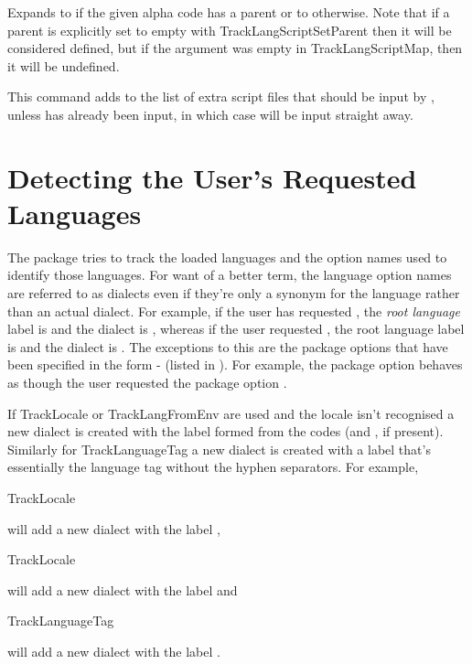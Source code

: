 \documentclass[titlepage=false,oneside,
 fontsize=12pt,captions=tableheading]{scrbook}
\newcommand{\optisotag}[1]{\isotag{opt.#1}}
\newcommand{\iso}[1]{\glslink{opt.#1}{\optfmt{\optisotag{#1}}}}
\begin{document}
Expands to  if the given alpha code has a parent 
or to  otherwise. Note that if a parent is explicitly
set to empty with \gls{TrackLangScriptSetParent} then it will be
considered defined, but if the  argument was empty in 
\gls{TrackLangScriptMap}, then it will be undefined.

This command adds  to the list of extra script files that should
be input by , unless 
 has already been input, in which
case  will be input straight away.


\chapter{Detecting the User's Requested Languages}
\label{sec:user}

The  package tries to track the loaded languages and
the option names used to identify those languages. For want of a better
term, the language option names are referred to as dialects even if
they're only a synonym for the language rather than an actual
dialect.  For example, if the user
has requested , the \emph{root language} label is
 and the dialect is , whereas if the
user requested , the root language label is
 and the dialect is . The
exceptions to this are the  package options that have been
specified in the form - (listed
in ). For
example, the package option \iso{british} behaves as though the
user requested the package option .

If \gls{TrackLocale} or \gls{TrackLangFromEnv} are used and the locale
isn't recognised a new dialect is created with the label formed from
the  codes (and , if present). 
Similarly for \gls{TrackLanguageTag} a new
dialect is created with a label that's essentially the language tag
without the hyphen separators.  For example, 
\begin{codebox}
\gls{TrackLocale}
\end{codebox}
will add a new dialect with the label ,
\begin{codebox}
\gls{TrackLocale}
\end{codebox}
will add a new dialect with the label  and 
\begin{codebox}
\gls{TrackLanguageTag}
\end{codebox}
will add a new dialect with the label .
\end{document}
